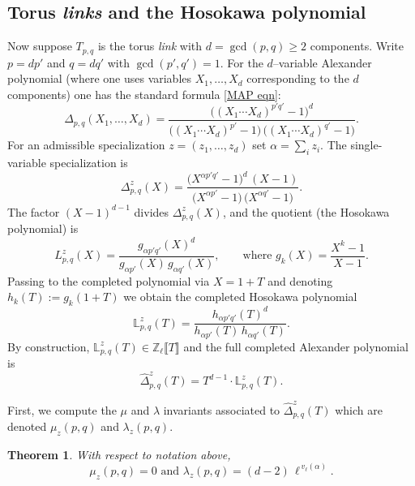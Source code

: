 \documentclass[table]{amsart}
\newtheorem{theorem}{Theorem}[section]
\numberwithin{equation}{section}
\begin{document}
\subsection{Torus \emph{links} and the Hosokawa polynomial}
Now suppose $T_{p,q}$ is the torus \emph{link} with $d=\gcd(p,q)\ge2$
components.  Write $p=dp'$ and $q=dq'$ with $\gcd(p',q')=1$.  For the
$d$--variable Alexander polynomial (where one uses variables
$X_1,\dots,X_d$ corresponding to the $d$ components) one has the standard
formula \eqref{MAP eqn}:
\[
\Delta_{p,q}(X_1,\dots,X_d)
= \frac{\big((X_1\cdots X_d)^{p'q'}-1\big)^d}
{\big((X_1\cdots X_d)^{p'}-1\big)\,\big((X_1\cdots X_d)^{q'}-1\big)}.
\]
For an admissible specialization $z=(z_1,\dots,z_d)$ set $\alpha=\sum_i z_i$.
The single-variable specialization is
\[
\Delta_{p,q}^z(X)
= \frac{\big(X^{\alpha p'q'}-1\big)^d\,(X-1)}
{\big(X^{\alpha p'}-1\big)\,\big(X^{\alpha q'}-1\big)}.
\]
The factor $(X-1)^{d-1}$ divides $\Delta_{p,q}^z(X)$, and the
quotient (the Hosokawa polynomial) is
\[
L_{p,q}^z(X)=\frac{g_{\alpha p'q'}(X)^d}{g_{\alpha p'}(X)\,g_{\alpha q'}(X)},
\qquad\text{where } g_k(X)=\frac{X^k-1}{X-1}.
\]
Passing to the completed polynomial via $X=1+T$ and denoting
$h_k(T):=g_k(1+T)$ we obtain the completed Hosokawa polynomial
\begin{equation}\label{L p q z formula}
\mathbb{L}_{p,q}^z(T)=\frac{h_{\alpha p'q'}(T)^d}
{h_{\alpha p'}(T)\,h_{\alpha q'}(T)}.
\end{equation}
By construction, $\mathbb{L}_{p,q}^z(T)\in\mathbb{Z}_\ell\llbracket T\rrbracket$
and the full completed Alexander polynomial is
\[
\widehat{\Delta}_{p,q}^z(T)=T^{d-1}\cdot \mathbb{L}_{p,q}^z(T).
\]
\par First, we compute the $\mu$ and $\lambda$ invariants associated to $\widehat{\Delta}_{p,q}^z(T)$ which are denoted $\mu_z(p,q)$ and $\lambda_z(p,q)$.

\begin{theorem}\label{thm 5.4}
    With respect to notation above, 
    \[\mu_z(p,q)=0\text{ and }\lambda_z(p,q)=(d-2)\,\ell^{\,v_\ell(\alpha)}.\]
\end{theorem}
\end{document}
